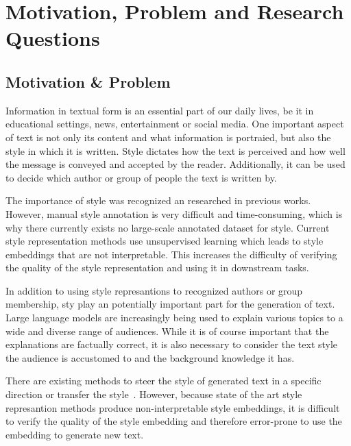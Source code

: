 
\section{Motivation, Problem and Research Questions}

\subsection{Motivation \& Problem}
Information in textual form is an essential part of our daily lives, be it in educational settings, news, entertainment or social media. One important aspect of text is not only its content and what information is portraied, but also the style in which it is written. Style dictates how the text is perceived and how well the message is conveyed and accepted by the reader. Additionally, it can be used to decide which author or group of people the text is written by.

The importance of style was recognized an researched in previous works. %
However, manual style annotation is very difficult and time-consuming, which is why there currently exists no large-scale annotated dataset for style. Current style representation methods use unsupervised learning which leads to style embeddings that are not interpretable. This increases the difficulty of verifying the quality of the style representation and using it in downstream tasks.

In addition to using style represantions to recognized authors or group membership, sty play an potentially important part for the generation of text. Large language models are increasingly being used to explain various topics to a wide and diverse range of audiences. While it is of course important that the explanations are factually correct, it is also necessary to consider the text style the audience is accustomed to and the background knowledge it has.

There are existing methods to steer the style of generated text in a specific direction or transfer the style~\cite{zhu-etal-2024-styleflow, ijcai2020p526}.
However, because state of the art style represantion methods produce non-interpretable style embeddings, it is difficult to verify the quality of the style embedding and therefore error-prone to use the embedding to generate new text.


